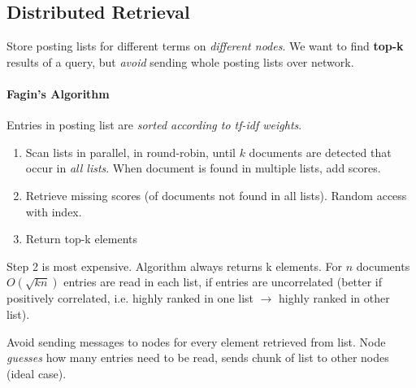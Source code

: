 \subsection{Distributed Retrieval}
Store posting lists for different terms on \emph{different nodes}. We want to find \textbf{top-k} results of a query, but \emph{avoid} sending whole posting lists over network.

\paragraph{Fagin's Algorithm}
Entries in posting list are \emph{sorted according to tf-idf weights}.
\begin{enumerate}
  \item Scan lists in parallel, in round-robin, until $k$ documents are detected that occur in \emph{all lists}. When document is found in multiple lists, add scores.
  \item Retrieve missing scores (of documents not found in all lists). Random access with index.
  \item Return top-k elements
\end{enumerate}

Step 2 is most expensive. Algorithm always returns k elements. For $n$ documents $O(\sqrt{kn})$ entries are read in each list, if entries are uncorrelated (better if positively correlated, i.e. highly ranked in one list $\rightarrow$ highly ranked in other list).

Avoid sending messages to nodes for every element retrieved from list. Node \emph{guesses} how many entries need to be read, sends chunk of list to other nodes (ideal case). 
